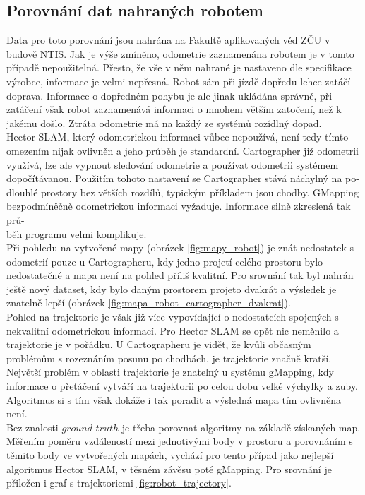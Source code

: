 \documentclass[12pt]{report}
\begin{document}
\subsection{Porovnání dat nahraných robotem} \label{sekce:data_robot}
Data pro toto porovnání jsou nahrána na Fakultě aplikovaných věd ZČU v budově NTIS. Jak je výše zmíněno, odometrie zaznamenána robotem je v tomto případě nepoužitelná. Přesto, že vše v něm nahrané je nastaveno dle specifikace výrobce, informace je velmi nepřesná. Robot sám při jízdě dopředu lehce zatáčí doprava. Informace o dopředném pohybu je ale jinak ukládána správně, při zatáčení však robot zaznamenává informaci o mnohem větším zatočení, než k jakému došlo. Ztráta odometrie má na každý ze systémů rozídlný dopad.\\
\indent Hector SLAM, který odometrickou informaci vůbec nepoužívá, není tedy tímto omezením nijak ovlivněn a jeho průběh je standardní. Cartographer již odometrii využívá, lze ale vypnout sledování odometrie a používat odometrii systémem dopočítávanou. Použitím tohoto nastavení se Cartographer stává náchylný na po-\\dlouhlé prostory bez větších rozdílů, typickým příkladem jsou chodby. GMapping bezpodmíněčně odometrickou informaci vyžaduje. Informace silně zkreslená tak prů-\\běh programu velmi komplikuje.\\
\indent Při pohledu na vytvořené mapy (obrázek \ref{fig:mapy_robot}) je znát nedostatek s odometrií pouze u Cartographeru, kdy jedno projetí celého prostoru bylo nedostatečné a mapa není na pohled příliš kvalitní. Pro srovnání tak byl nahrán ještě nový dataset, kdy bylo daným prostorem projeto dvakrát a výsledek je znatelně lepší (obrázek \ref{fig:mapa_robot_cartographer_dvakrat}).\\
\indent Pohled na trajektorie je však již více vypovídající o nedostatcích spojených s nekvalitní odometrickou informací. Pro Hector SLAM se opět nic neměnilo a trajektorie je v pořádku. U Cartographeru je vidět, že kvůli občasným problémům s rozeznáním posunu po chodbách, je trajektorie značně kratší. Největší problém v oblasti trajektorie je znatelný u systému gMapping, kdy informace o přetáčení vytváří na trajektorii po celou dobu velké výchylky a zuby. Algoritmus si s tím však dokáže i tak poradit a výsledná mapa tím ovlivněna není.\\
\indent Bez znalosti $ground$ $truth$ je třeba porovnat algoritmy na základě získaných map. Měřením poměru vzdáleností mezi jednotivými body v prostoru a porovnáním s těmito body ve vytvořených mapách, vychází pro tento případ jako nejlepší algoritmus Hector SLAM, v těsném závěsu poté gMapping. Pro srovnání je přiložen i graf s trajektoriemi \ref{fig:robot_trajectory}. 
\end{document}
